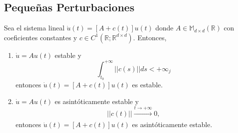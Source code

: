 %

\subsection{Pequeñas Perturbaciones}

\begin{theo}
  Sea el sistema lineal $\dot{{u}}(t) = [A + c(t)] u(t)$ donde $A \in \mathbb{M}_{d \times d}(\mathbb{R})$ con coeficientes constantes y $c \in C^{1}(\mathbb{R}; \mathbb{R}^{d \times d})$. Entonces,
  \begin{enumerate}[label=(\roman*)]
    \item $\dot{u} = A u(t)$ estable y
      \[
        \int_{t_{0}}^{+ \infty} ||c(s)|| ds < + \infty_{j}
      \]
      entonces $\dot{{u}}(t) = [A + c(t)] u(t)$ es estable.
    \item $\dot{u} = A u(t)$ es asintóticamente estable y
      \[
        ||c(t)|| \xrightarrow[]{ t \rightarrow +\infty }0,
      \]
      entonces $\dot{{u}}(t) = [A + c(t)] u(t)$ es asintóticamente estable.
  \end{enumerate}
\end{theo}

